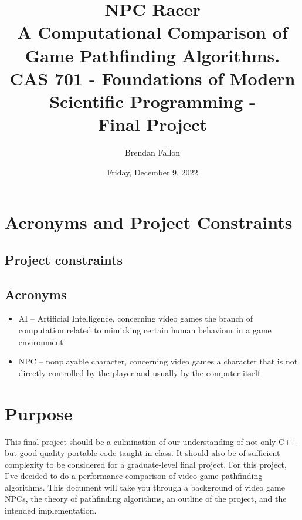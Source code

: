 \documentclass[letterpaper,12pt]{article}  %
\title{ %
    NPC Racer \\
    \large A Computational Comparison of Game Pathfinding Algorithms. \\
    CAS 701 - Foundations of Modern Scientific Programming - \\
    Final Project}
\date{Friday, December 9, 2022} %
\author{Brendan Fallon}
\begin{document}

\maketitle  %

\tableofcontents  %

\section{Acronyms and Project Constraints}

\subsection{Project constraints}





\subsection{Acronyms}

\begin{itemize}
	\item AI – Artificial Intelligence, concerning video games the branch of 
	computation 
	related to mimicking certain human behaviour in a game environment \cite{ 
		millingtonAIGamesThird2019}
	\item NPC – nonplayable character, concerning video games a character that 
	is not 
	directly controlled by the player and usually by the computer itself \cite{ 
		millingtonAIGamesThird2019}
\end{itemize}




\section{Purpose}
This final project should be a culmination of our understanding of not only C++ 
but good quality portable code taught in class. It should also be of sufficient 
complexity to be considered for a graduate-level final project. For this 
project, I’ve decided to do a performance comparison of video game pathfinding 
algorithms. This document will take you through a background of video game 
NPCs, the theory of pathfinding algorithms, an outline of the project, and the 
intended implementation. 
\end{document}
